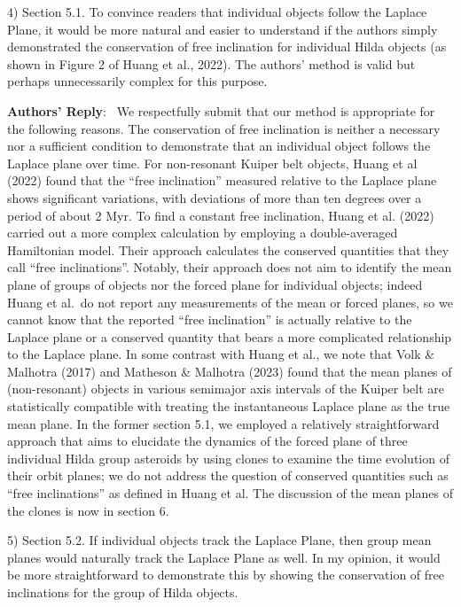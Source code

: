 \documentclass[11pt]{article}
\newenvironment{reply}
   {\medskip \noindent \begin{sf}\textbf{Authors' Reply}:\  }
   {\medskip \end{sf}\medskip}
\begin{document}
4) Section 5.1. To convince readers that individual objects follow the Laplace Plane, it would be more natural and easier to understand if the authors simply demonstrated the conservation of free inclination for individual Hilda objects (as shown in Figure 2 of Huang et al., 2022). The authors' method is valid but perhaps unnecessarily complex for this purpose.

\begin{reply}
We respectfully submit that our method is appropriate for the following reasons.
The conservation of free inclination is neither a necessary nor a sufficient condition to demonstrate that an individual object follows the Laplace plane over time.
For non-resonant Kuiper belt objects, Huang et al (2022) found that the ``free inclination'' measured relative to the Laplace plane shows significant variations, with {deviations of more than ten degrees over a period of about 2 Myr.}
To find a constant free inclination, Huang et al. (2022) carried out a more complex calculation by employing a double-averaged Hamiltonian model.
Their approach calculates the conserved quantities that they  call ``free inclinations''.
Notably, their approach does not aim to identify the mean plane of groups of objects nor the forced plane for individual objects; indeed Huang et al.~do not report any measurements of the mean or forced planes, so we cannot know that the reported ``free inclination'' is actually relative to the Laplace plane or a conserved quantity that bears a more complicated relationship to the Laplace plane.
In some contrast with Huang et al., we note that Volk \& Malhotra (2017) and Matheson \& Malhotra (2023) found that the mean planes of (non-resonant) objects in various semimajor axis intervals of the Kuiper belt are statistically compatible with treating the instantaneous Laplace plane as the true mean plane.
In the former section 5.1, we employed a relatively straightforward approach that aims to elucidate the dynamics of the forced plane of three individual Hilda group asteroids by using clones to examine the time evolution of their orbit planes; we do not address the question of conserved quantities such as ``free inclinations'' as defined in Huang et al. 
The discussion of the mean planes of the clones is now in section 6.
\end{reply}

5) Section 5.2. If individual objects track the Laplace Plane, then group mean planes would naturally track the Laplace Plane as well. In my opinion, it would be more straightforward to demonstrate this by showing the conservation of free inclinations for the group of Hilda objects.
\end{document}
